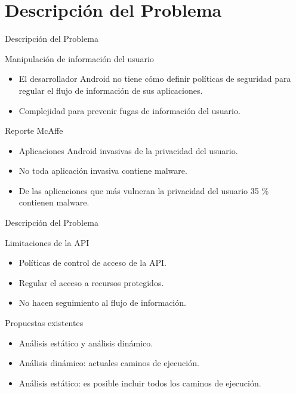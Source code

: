  \section{Descripción del Problema}

\begin{frame}{Descripción del Problema}
	\begin{block}{Manipulación de información del usuario}
	\begin{itemize}
	\item El desarrollador Android no tiene cómo definir políticas de seguridad para
	regular el flujo de información de sus aplicaciones.
	\item Complejidad para prevenir fugas de información del usuario.
	\end{itemize}
	\end{block}
	\pause
	\begin{block}{Reporte McAffe}
	\begin{itemize}
	\item Aplicaciones Android invasivas de la privacidad del usuario.
	\item No toda aplicación invasiva contiene malware.
	\item De las aplicaciones que más vulneran la privacidad del usuario 35 \%
	contienen malware.
	\end{itemize}
	\end{block}
\end{frame}

\begin{frame}{Descripción del Problema}
\begin{block}{Limitaciones de la API}
\begin{itemize}
  \item Políticas de control de acceso de la API.
  \item Regular el acceso a recursos protegidos.
  \item No hacen seguimiento al flujo de información.
\end{itemize}
\end{block}
\begin{block}{Propuestas existentes}
\begin{itemize}
  \item Análisis estático y análisis dinámico.
  \item Análisis dinámico: actuales caminos de ejecución.
  \item Análisis estático: es posible incluir todos los caminos de ejecución.
\end{itemize}
\end{block}
\end{frame}

